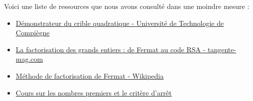 \documentclass[11pt,a4paper]{article}
\begin{document}
	Voici une liste de ressources que nous avons consulté dans une moindre mesure : 
	\begin{itemize}
		\item \href{https://www.utc.fr/~wschon/sr06/UtCrible/UtCrible.html#about}{Démonstrateur du crible quadratique - Université de Technologie de Compiègne}
		\item \href{https://www.tangente-mag.com/article.php?id=7059}{La factorisation des grands entiers : de Fermat au code RSA - tangente-mag.com}
		\item \href{https://fr.wikipedia.org/wiki/M%C3%A9thode_de_factorisation_de_Fermat}{Méthode de factorisation de Fermat - Wikipedia}	
		\item\href{https://mathrix.fr/maths-expertes/arithmetique/nombres-premiers-et-critere-darret-1359}{Cours sur les nombres premiers et le critère d'arrêt}
	\end{itemize}
	
	
	
\end{document}
